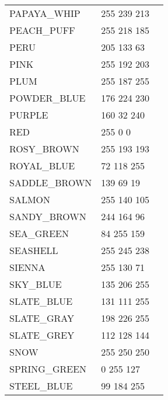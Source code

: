 \begin{longtable}{l|l|l}
PAPAYA\_WHIP & 255 239 213 & \colorbox[RGB]{255 239 213}{\phantom{MMMMMMMM}}\\
PEACH\_PUFF & 255 218 185 & \colorbox[RGB]{255 218 185}{\phantom{MMMMMMMM}}\\
PERU & 205 133 63 & \colorbox[RGB]{205 133 63}{\phantom{MMMMMMMM}}\\
PINK & 255 192 203 & \colorbox[RGB]{255 192 203}{\phantom{MMMMMMMM}}\\
PLUM & 255 187 255 & \colorbox[RGB]{255 187 255}{\phantom{MMMMMMMM}}\\
POWDER\_BLUE & 176 224 230 & \colorbox[RGB]{176 224 230}{\phantom{MMMMMMMM}}\\
PURPLE & 160 32 240 & \colorbox[RGB]{160 32 240}{\phantom{MMMMMMMM}}\\
RED & 255 0 0 & \colorbox[RGB]{255 0 0}{\phantom{MMMMMMMM}}\\
ROSY\_BROWN & 255 193 193 & \colorbox[RGB]{255 193 193}{\phantom{MMMMMMMM}}\\
ROYAL\_BLUE & 72 118 255 & \colorbox[RGB]{72 118 255}{\phantom{MMMMMMMM}}\\
SADDLE\_BROWN & 139 69 19 & \colorbox[RGB]{139 69 19}{\phantom{MMMMMMMM}}\\
SALMON & 255 140 105 & \colorbox[RGB]{255 140 105}{\phantom{MMMMMMMM}}\\
SANDY\_BROWN & 244 164 96 & \colorbox[RGB]{244 164 96}{\phantom{MMMMMMMM}}\\
SEA\_GREEN & 84 255 159 & \colorbox[RGB]{84 255 159}{\phantom{MMMMMMMM}}\\
SEASHELL & 255 245 238 & \colorbox[RGB]{255 245 238}{\phantom{MMMMMMMM}}\\
SIENNA & 255 130 71 & \colorbox[RGB]{255 130 71}{\phantom{MMMMMMMM}}\\
SKY\_BLUE & 135 206 255 & \colorbox[RGB]{135 206 255}{\phantom{MMMMMMMM}}\\
SLATE\_BLUE & 131 111 255 & \colorbox[RGB]{131 111 255}{\phantom{MMMMMMMM}}\\
SLATE\_GRAY & 198 226 255 & \colorbox[RGB]{198 226 255}{\phantom{MMMMMMMM}}\\
SLATE\_GREY & 112 128 144 & \colorbox[RGB]{112 128 144}{\phantom{MMMMMMMM}}\\
SNOW & 255 250 250 & \colorbox[RGB]{255 250 250}{\phantom{MMMMMMMM}}\\
SPRING\_GREEN & 0 255 127 & \colorbox[RGB]{0 255 127}{\phantom{MMMMMMMM}}\\
STEEL\_BLUE & 99 184 255 & \colorbox[RGB]{99 184 255}{\phantom{MMMMMMMM}}\\

\end{longtable}
